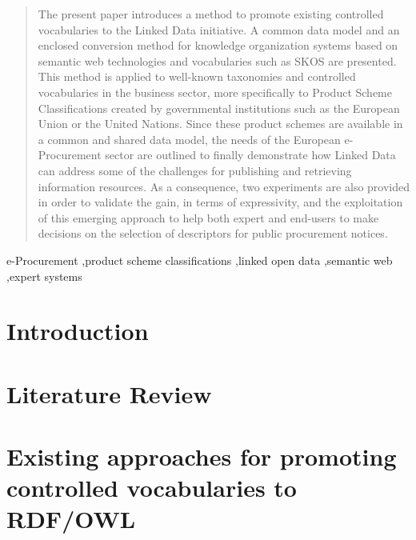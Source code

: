\documentclass[preprint,12pt]{elsarticle}
\begin{document}
\begin{frontmatter}
\begin{abstract}
The present paper introduces a method to promote existing controlled vocabularies to 
the Linked Data initiative. A common data model and an enclosed conversion 
method for knowledge organization systems based on semantic web technologies and 
vocabularies such as SKOS are presented. This method is applied to well-known 
taxonomies and controlled vocabularies in the business sector, more specifically 
to Product Scheme Classifications created by governmental institutions such as 
the European Union or the United Nations. Since these product schemes are 
available in a common and shared data model, the needs of the European 
e-Procurement sector are outlined to finally demonstrate how Linked Data can 
address some of the challenges for publishing and retrieving information 
resources. As a consequence, two experiments are also provided in order to 
validate the gain, in terms of expressivity, and the exploitation of this emerging 
approach to help both expert and end-users to make decisions on the selection of descriptors 
for public procurement notices.
\end{abstract}

\begin{keyword}
e-Procurement \sep product scheme classifications \sep  linked open data \sep  semantic web \sep expert systems


\end{keyword}


\end{frontmatter}


\section{Introduction}

\section{Literature Review}\label{sect:related-work}

\section{Existing approaches for promoting controlled vocabularies to RDF/OWL}\label{sect:thesauri}

\end{document}
